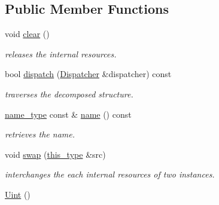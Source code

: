 \subsection*{Public Member Functions}
\begin{DoxyCompactItemize}
\item 
\hypertarget{classhryky_1_1reduction_1_1_uint_a53ba3b899d2745a8c6f921477d6097e2}{void \hyperlink{classhryky_1_1reduction_1_1_uint_a53ba3b899d2745a8c6f921477d6097e2}{clear} ()}\label{classhryky_1_1reduction_1_1_uint_a53ba3b899d2745a8c6f921477d6097e2}

\begin{DoxyCompactList}\small\item\em releases the internal resources. \end{DoxyCompactList}\item 
bool \hyperlink{classhryky_1_1reduction_1_1_base_a71b31d4d0ed915254e2cb1ef217f28c4}{dispatch} (\hyperlink{classhryky_1_1reduction_1_1_dispatcher}{Dispatcher} \&dispatcher) const 
\begin{DoxyCompactList}\small\item\em traverses the decomposed structure. \end{DoxyCompactList}\item 
\hypertarget{classhryky_1_1reduction_1_1_base_a842569265d741905eb8a353d3935f1d1}{\hyperlink{namespacehryky_1_1reduction_ac686c30a4c8d196bbd0f05629a6b921f}{name\-\_\-type} const \& \hyperlink{classhryky_1_1reduction_1_1_base_a842569265d741905eb8a353d3935f1d1}{name} () const }\label{classhryky_1_1reduction_1_1_base_a842569265d741905eb8a353d3935f1d1}

\begin{DoxyCompactList}\small\item\em retrieves the name. \end{DoxyCompactList}\item 
\hypertarget{classhryky_1_1reduction_1_1_uint_ac887a8197088d79c4839d21c3b5feeae}{void \hyperlink{classhryky_1_1reduction_1_1_uint_ac887a8197088d79c4839d21c3b5feeae}{swap} (\hyperlink{classhryky_1_1reduction_1_1_base_af02a7dee6042080b7380afd2f9500a42}{this\-\_\-type} \&src)}\label{classhryky_1_1reduction_1_1_uint_ac887a8197088d79c4839d21c3b5feeae}

\begin{DoxyCompactList}\small\item\em interchanges the each internal resources of two instances. \end{DoxyCompactList}\item 
\hypertarget{classhryky_1_1reduction_1_1_uint_a2879bb48e55e0f3cdb45e9becd29d335}{\hyperlink{classhryky_1_1reduction_1_1_uint_a2879bb48e55e0f3cdb45e9becd29d335}{Uint} ()}\label{classhryky_1_1reduction_1_1_uint_a2879bb48e55e0f3cdb45e9becd29d335}


\end{DoxyCompactItemize}
